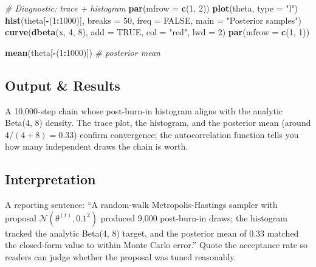 \documentclass[
]{article}
\newenvironment{Shaded}{\begin{snugshade}}{\end{snugshade}}
\newcommand{\AttributeTok}[1]{\textcolor[rgb]{0.13,0.29,0.53}{#1}}
\newcommand{\CommentTok}[1]{\textcolor[rgb]{0.56,0.35,0.01}{\textit{#1}}}
\newcommand{\ConstantTok}[1]{\textcolor[rgb]{0.56,0.35,0.01}{#1}}
\newcommand{\DecValTok}[1]{\textcolor[rgb]{0.00,0.00,0.81}{#1}}
\newcommand{\FunctionTok}[1]{\textcolor[rgb]{0.13,0.29,0.53}{\textbf{#1}}}
\newcommand{\NormalTok}[1]{#1}
\newcommand{\SpecialCharTok}[1]{\textcolor[rgb]{0.81,0.36,0.00}{\textbf{#1}}}
\newcommand{\StringTok}[1]{\textcolor[rgb]{0.31,0.60,0.02}{#1}}
\begin{document}
\begin{Shaded}
\begin{Highlighting}[]
\CommentTok{\# Diagnostic: trace + histogram}
\FunctionTok{par}\NormalTok{(}\AttributeTok{mfrow =} \FunctionTok{c}\NormalTok{(}\DecValTok{1}\NormalTok{, }\DecValTok{2}\NormalTok{))}
\FunctionTok{plot}\NormalTok{(theta, }\AttributeTok{type =} \StringTok{"l"}\NormalTok{)}
\FunctionTok{hist}\NormalTok{(theta[}\SpecialCharTok{{-}}\NormalTok{(}\DecValTok{1}\SpecialCharTok{:}\DecValTok{1000}\NormalTok{)], }\AttributeTok{breaks =} \DecValTok{50}\NormalTok{, }\AttributeTok{freq =} \ConstantTok{FALSE}\NormalTok{, }\AttributeTok{main =} \StringTok{"Posterior samples"}\NormalTok{)}
\FunctionTok{curve}\NormalTok{(}\FunctionTok{dbeta}\NormalTok{(x, }\DecValTok{4}\NormalTok{, }\DecValTok{8}\NormalTok{), }\AttributeTok{add =} \ConstantTok{TRUE}\NormalTok{, }\AttributeTok{col =} \StringTok{"red"}\NormalTok{, }\AttributeTok{lwd =} \DecValTok{2}\NormalTok{)}
\FunctionTok{par}\NormalTok{(}\AttributeTok{mfrow =} \FunctionTok{c}\NormalTok{(}\DecValTok{1}\NormalTok{, }\DecValTok{1}\NormalTok{))}

\FunctionTok{mean}\NormalTok{(theta[}\SpecialCharTok{{-}}\NormalTok{(}\DecValTok{1}\SpecialCharTok{:}\DecValTok{1000}\NormalTok{)])     }\CommentTok{\# posterior mean}
\end{Highlighting}
\end{Shaded}

\subsection{Output \& Results}\label{output-results}

A 10,000-step chain whose post-burn-in histogram aligns with the
analytic Beta(4, 8) density. The trace plot, the histogram, and the
posterior mean (around \(4 / (4+8) = 0.33\)) confirm convergence; the
autocorrelation function tells you how many independent draws the chain
is worth.

\subsection{Interpretation}\label{interpretation}

A reporting sentence: ``A random-walk Metropolis-Hastings sampler with
proposal \(\mathcal N(\theta^{(t)}, 0.1^2)\) produced 9,000 post-burn-in
draws; the histogram tracked the analytic Beta(4, 8) target, and the
posterior mean of 0.33 matched the closed-form value to within Monte
Carlo error.'' Quote the acceptance rate so readers can judge whether
the proposal was tuned reasonably.
\end{document}
